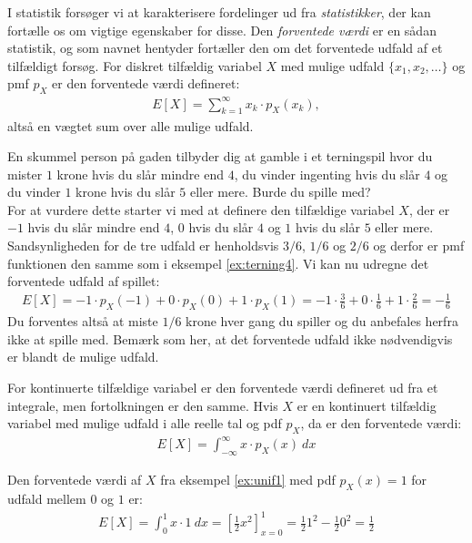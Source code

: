 I statistik forsøger vi at karakterisere fordelinger ud fra \emph{statistikker}, der kan fortælle os om vigtige egenskaber for disse. Den \emph{forventede værdi} er en sådan statistik, og som navnet hentyder fortæller den om det forventede udfald af et tilfældigt forsøg. For diskret tilfældig variabel  $X$ med mulige udfald $\{x_1,x_2,\dots\}$ og pmf $p_X$ er den forventede værdi defineret:
\begin{align*}
E[X] = \sum_{k=1}^{\infty} x_k\cdot p_X(x_k),
\end{align*}
altså en vægtet sum over alle mulige udfald.
\begin{example} \label{ex:game}
En skummel person på gaden tilbyder dig at gamble i et terningspil hvor du mister $1$ krone hvis du slår mindre end $4$, du vinder ingenting hvis du slår $4$ og du vinder $1$ krone hvis du slår $5$ eller mere. Burde du spille med? \\
For at vurdere dette starter vi med at definere den tilfældige variabel $X$, der er $-1$ hvis du slår mindre end $4$, $0$ hvis du slår $4$ og $1$ hvis du slår $5$ eller mere. Sandsynligheden for de tre udfald er henholdsvis $3/6$, $1/6$ og $2/6$ og derfor er pmf funktionen den samme som i eksempel \ref{ex:terning4}. Vi kan nu udregne det forventede udfald af spillet:
\begin{align*}
E[X] = -1\cdot p_X(-1) + 0\cdot p_X(0) + 1\cdot p_X(1) = -1\cdot \frac{3}{6} + 0\cdot\frac{1}{6} + 1\cdot \frac{2}{6} = -\frac{1}{6}
\end{align*}
Du forventes altså at miste $1/6$ krone hver gang du spiller og du anbefales herfra ikke at spille med. Bemærk som her, at det forventede udfald ikke nødvendigvis er blandt de mulige udfald. 
\end{example}
For kontinuerte tilfældige variabel er den forventede værdi defineret ud fra et integrale, men fortolkningen er den samme. Hvis $X$ er en kontinuert tilfældig variabel med mulige udfald i alle reelle tal og pdf $p_X$, da er den forventede værdi:
\begin{align*}
E[X] = \int_{-\infty}^{\infty} x \cdot p_X(x) \ dx
\end{align*}
\begin{example}
Den forventede værdi af $X$ fra eksempel \ref{ex:unif1} med pdf $p_X(x) = 1$ for udfald mellem $0$ og $1$ er:
\begin{align*}
E[X] = \int_0^1 x\cdot 1 \ dx = \left[\frac{1}{2}x^2 \right]_{x=0}^1 = \frac{1}{2}1^2 - \frac{1}{2}0^2 = \frac{1}{2}
\end{align*}
\end{example}

